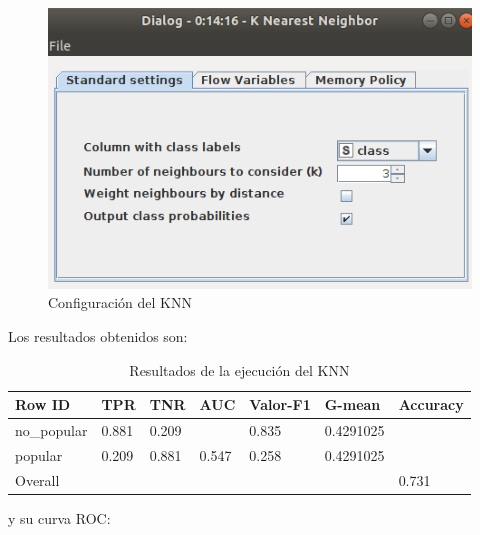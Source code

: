 \begin{figure}[H] %
	\centering
	\includegraphics[scale=0.4]{conf-knn-p.png}  %
	\caption{Configuración del KNN} 
	\label{fig:conf-knn-p}
\end{figure}

Los resultados obtenidos son:

\begin{table}[H]
	\centering
	\begin{tabular}{|l|l|l|l|l|l|l|}
		\hline
		Row ID      & TPR   & TNR   & AUC   & Valor-F1 & G-mean    & Accuracy \\ \hline
		no\_popular & 0.881 & 0.209 &       & 0.835    & 0.4291025 &          \\ \hline
		popular     & 0.209 & 0.881 & 0.547 & 0.258    & 0.4291025 &          \\ \hline
		Overall     &       &       &       &          &           & 0.731    \\ \hline
	\end{tabular}
	\caption{Resultados de la ejecución del KNN}
	\label{tab:knn}
\end{table}

y su curva ROC:

